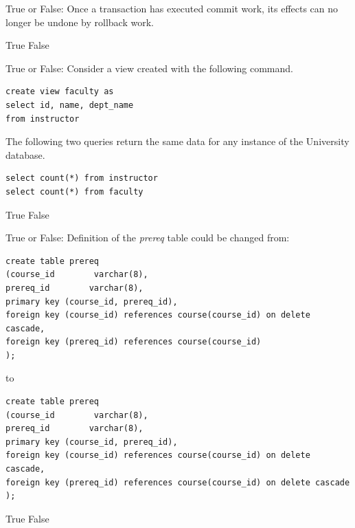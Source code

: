 \documentclass[12pt, addpoints, answers]{exam}
\begin{document}
\begin{questions}
\begin{minipage}{\linewidth}
\question[2]
True or False: Once a transaction has executed commit work, its effects can no longer be undone by rollback work.\par\vspace{0.5em}
\begin{checkboxes}
    \CorrectChoice True
    \choice False
\end{checkboxes}
\end{minipage}\vspace{1em}

\begin{minipage}{\linewidth}
\question[2]
True or False: Consider a view created with the following command.\par\vspace{0.5em}
\begin{verbatim}
create view faculty as
select id, name, dept_name
from instructor
\end{verbatim}
The following two queries return the same data for any instance of the University database.\par\vspace{0.5em}
\begin{verbatim}
select count(*) from instructor
select count(*) from faculty
\end{verbatim}
\begin{checkboxes}
    \choice True
    \CorrectChoice False
\end{checkboxes}
\end{minipage}\vspace{1em}

\begin{minipage}{\linewidth}
\question[2]
True or False: Definition of the \textit{prereq} table could be changed from: \par\vspace{0.5em}
\begin{verbatim}
create table prereq
(course_id        varchar(8), 
prereq_id        varchar(8),
primary key (course_id, prereq_id),
foreign key (course_id) references course(course_id) on delete cascade,
foreign key (prereq_id) references course(course_id)
);
\end{verbatim}
to\par\vspace{0.5em}
\begin{verbatim}
create table prereq
(course_id        varchar(8), 
prereq_id        varchar(8),
primary key (course_id, prereq_id),
foreign key (course_id) references course(course_id) on delete cascade,
foreign key (prereq_id) references course(course_id) on delete cascade
);
\end{verbatim}
\begin{checkboxes}
    \CorrectChoice True
    \choice False
\end{checkboxes}
\end{minipage}\vspace{1em}


\end{questions}
\end{document}
